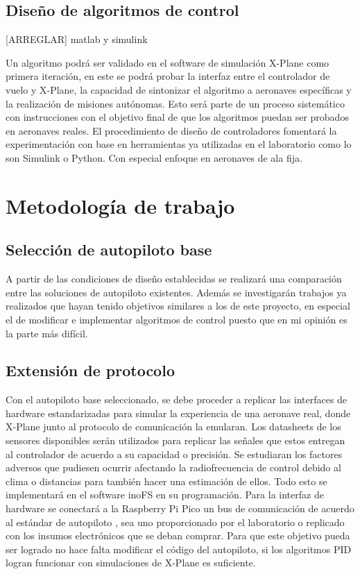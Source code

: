 \subsection{Diseño de algoritmos de control}

[ARREGLAR]
matlab y simulink

Un algoritmo podrá ser validado en el software de simulación X-Plane como primera iteración, en este se podrá probar la interfaz entre el controlador de vuelo y X-Plane, la capacidad de sintonizar el algoritmo a aeronaves específicas y la realización de misiones autónomas. Esto será parte de un proceso sistemático con instrucciones con el objetivo final de que los algoritmos puedan ser probados en aeronaves reales. El procedimiento de diseño de controladores fomentará la experimentación con base en herramientas ya utilizadas en el laboratorio como lo son Simulink o Python. Con especial enfoque en aeronaves de ala fija.

\section{Metodología de trabajo}

\subsection{Selección de autopiloto base}

A partir de las condiciones de diseño establecidas se realizará una comparación entre las soluciones de autopiloto existentes. Además se investigarán trabajos ya realizados que hayan tenido objetivos similares a los de este proyecto, en especial el de modificar e implementar algoritmos de control puesto que en mi opinión es la parte más difícil.

\subsection{Extensión de protocolo}

Con el autopiloto base seleccionado, se debe proceder a replicar las interfaces de hardware estandarizadas para simular la experiencia de una aeronave real, donde X-Plane junto al protocolo de comunicación la emularan. Los datasheets de los sensores disponibles serán utilizados para replicar las señales que estos entregan al controlador de acuerdo a su capacidad o precisión. Se estudiaran los factores adversos que pudiesen ocurrir afectando la radiofrecuencia de control debido al clima o distancias para también hacer una estimación de ellos. Todo esto se implementará en el software inoFS \cite{inofs} en su programación. Para la interfaz de hardware se conectará a la Raspberry Pi Pico un bus de comunicación de acuerdo al estándar de autopiloto \cite{px4-bus}, sea uno proporcionado por el laboratorio o replicado con los insumos electrónicos que se deban comprar. Para que este objetivo pueda ser logrado no hace falta modificar el código del autopiloto, si los algoritmos PID logran funcionar con simulaciones de X-Plane es suficiente.

